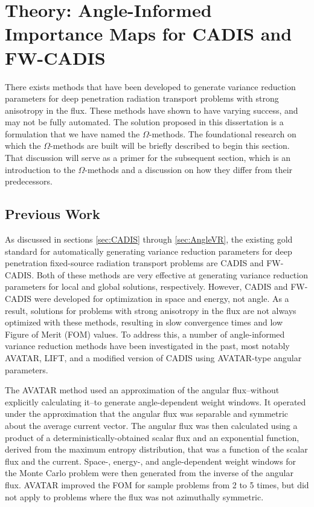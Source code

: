 \section{Theory: Angle-Informed Importance Maps for CADIS and FW-CADIS}
\label{sec:methodtheory}

There exists methods that have been developed to generate
variance reduction parameters
for deep penetration radiation transport problems with strong anisotropy in the
flux. These methods have shown to have varying success, and may not be fully
automated. The solution proposed in this dissertation is a formulation that we
have named the $\Omega$-methods. The foundational research
on which the $\Omega$-methods are built will be briefly described to begin this
section. That discussion will serve as a primer for the subsequent section, which
is an introduction to the $\Omega$-methods and a discussion on how they differ
from their predecessors.

\subsection{Previous Work}
\label{sec:omegabknd}

As discussed in sections \ref{sec:CADIS}
through \ref{sec:AngleVR}, the existing gold standard for automatically
generating variance reduction parameters for deep penetration
fixed-source radiation transport problems are
CADIS and FW-CADIS. Both of these methods are very effective at
generating variance reduction parameters for local and global solutions,
respectively. However, CADIS and FW-CADIS were developed for optimization in
space and energy, not angle. As a result, solutions for problems with
strong anisotropy in the flux are not always optimized with these methods,
resulting in slow convergence times and low Figure of Merit (FOM) values.
To address this, a number of angle-informed variance reduction
methods have been
investigated in the past, most notably AVATAR, LIFT, and a modified version of
CADIS using AVATAR-type angular parameters.

The AVATAR method
\cite{van_riper_generation_1995, van_riper_avatarautomatic_1997} used an
approximation of the angular flux--without explicitly calculating it--to
generate angle-dependent weight windows. It operated under the approximation
that
the angular flux was separable and symmetric about the average current vector.
The angular flux was then calculated using
a product of a deterministically-obtained
scalar flux and an exponential function, derived from the
maximum entropy distribution, that was a function of the scalar flux and the
current. Space-, energy-, and angle-dependent weight windows for
the Monte Carlo problem were then generated from the inverse of the angular
flux. AVATAR improved the FOM for sample problems from 2 to 5 times, but did not
apply to problems where the flux was not azimuthally symmetric.

